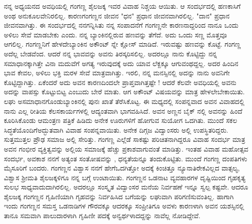 {ನನ್ನ ಅಧ್ಯಯನದ ಅವಧಿಯಲ್ಲಿ ಗಂಗಣ್ಣ ಶೈಲಜಕ್ಕ ಇವರ ವಿವಾಹ ನಿಶ್ಚಯ ಆಯಿತು. ಆ ಸಂದರ್ಭದಲ್ಲಿ ಹಣಕಾಸಿಗೆ ಅಂಥ ಅನುಕೂಲವೇನಿರಲಿಲ್ಲ. ಕಾರಣ\break ಗಂಗಣ್ಣನ ಜೀವನ "ಧನ" ಪ್ರಧಾನ ಜೀವನವಾಗಿರಲಿಲ್ಲ. "ದಾನ" ಪ್ರಧಾನ  ಜೀವನವಾಗಿತ್ತು. ಈ ಸಂದರ್ಭದಲ್ಲಿ ನನಗನ್ನಿಸಿತು \enginline{-} ನನ್ನ ಸಂಪಾದನೆಗೆ ಗಂಗಣ್ಣನೇ ಕಾರಣನಾದ್ದರಿಂದ ನಾನೂ ಒಂದು ಅಳಿಲು ಸೇವೆ ಮಾಡಬೇಕು ಎಂದು. ನನ್ನ ಬ್ಯಾಂಕಿನಲ್ಲಿರುವ ಹಣವನ್ನು ತೆಗೆದೆ. ಅದು ಒಂದು ಸಣ್ಣ ಮೊತ್ತವೂ ಆಗಲಿಲ್ಲ. ಗಂಗಣ್ಣನಿಗೆ ಹೇಳದೇ\break ಬ್ಯಾಂಕಿನ ಅಕೌಂಟ್ ನ್ನೇ ಕ್ಲೋಸ್ ಮಾಡಿದೆ. ಇರುವಷ್ಟು ಹಣವನ್ನು ಕೊಟ್ಟೆ.  ಗಂಗಣ್ಣ ಅದೆಲ್ಲ  ಬೇಡವೆಂದ. ಆದರೆ ನನ್ನ ಭಾವವನ್ನು ಅವನು ತಿರಸ್ಕರಿಸಲಿಲ್ಲ. ಅದರಲ್ಲೂ ನಾನು ಕೊಟ್ಟಿದ್ದು ನನ್ನ ಸಮಾಧಾನಕ್ಕಾಗಿತ್ತೇ ವಿನಾ ಮದುವೆಗೆ ಅಗತ್ಯ ಇರುವುದಕ್ಕೆ ಅದು ಯಾವ ಲೆಕ್ಖಕ್ಕೂ ಆಗುವಂಥದ್ದಲ್ಲ. ಅದರ ಹಿಂದಿನ ಭಾವ ಕೇವಲ, ಅಳಿಲು ಭಕ್ತಿ ಮರಳ ಸೇವೆ  ಮಾತ್ರವಾಗಿತ್ತು. ಇರಲಿ, ನನ್ನ ಮನಸ್ಸಿನಲ್ಲಿ ಅದನ್ನು ನಾನು ಅವನಿಗೇ ಕೊಟ್ಟಿದ್ದಾಗಿತ್ತು. ಏಕೆಂದರೆ ಅದು ಅವನ ಕಾರಣದಿಂದಲೇ ಪ್ರಾಪ್ತವಾಗಿತ್ತಷ್ಟೇ ! ಆದರೆ ಕೆಲವೇ ಅವಧಿಯಲ್ಲಿ ಅವನು ಅದನ್ನು ವಾಪಸ್ಸು ಕೊಟ್ಟುಬಿಟ್ಟ ಎಂಬುದು ಬೇರೆ ಮಾತು. ಆಗ ಅಕೌಂಟ್ ವಿಷಯವನ್ನು ಮಾತ್ರ ಹೇಳಲೇಬೇಕಾಯಿತು. ಲಘು ಅಸಮಾಧಾನಗೊಂಡು\break ಬ್ಯಾಂಕಿನಲ್ಲಿ  ಪುನಃ ಖಾತೆ ತೆರೆಸಿಕೊಟ್ಟ. ಈ ಮಧ್ಯದಲ್ಲಿ ಸಂಪನ್ನವಾದ ಅವನ \hbox{ವಿವಾಹದಲ್ಲಿ} ನಾನು ಎಲ್ಲ ರೀತಿಯ ಕೆಲಸ\enginline{-}ಕಾರ್ಯಗಳಲ್ಲಿ ಆದ್ಯಂತವಾಗಿ ಭಾಗವಹಿಸಿದೆ. ಅವನ ಅಣ್ಣನ ಬೈಕ್ ನಲ್ಲಿ ಅವನನ್ನು ಹಿಂದೆ ಕೂರಿಸಿಕೊಂಡು ಆಮಂತ್ರಣ ಪತ್ರಿಕೆ ಹಿಡಿದು ಅನೇಕ ಊರುಗಳಿಗೆ ಹೋಗುವ ಸುಯೋಗ ಒದಗಿತು.  ಮುಂದೆ ಸಕಲ ಸಿದ್ಧತೆಯೊಂದಿಗೆ\break ಅದ್ಭುತವಾಗಿ ವಿವಾಹ ಸಂಪನ್ನವಾಯಿತು. ಅನೇಕ ದಿಗ್ಗಜ ವಿದ್ವಾಂಸರು ಅಲ್ಲಿ ಉಪಸ್ಥಿತರಿದ್ದರು. ಸುತ್ತಮುತ್ತಲ ಪ್ರೌಢ ಸಮಾಜ ಅಲ್ಲಿ ಸೇರಿತ್ತು. ಗಂಗಣ್ಣ ಎಲ್ಲೆಡೆ ಸಾಕಷ್ಟು  ಪರಿಚಿತನಾಗಿದ್ದರೂ ವಿವಾಹ ಸಂದರ್ಭ ಮಾತ್ರ ಅವನ ಗಂಭೀರ ವ್ಯಕ್ತಿತ್ವವನ್ನು ಅಲ್ಲಿಯ ಸಮಾಜಕ್ಕೆ  ಹೆಚ್ಚು ಪ್ರಕಾಶವಾಗುವಂತೆ ಮಾಡಿತ್ತು. ಇಂತಹ ವಿವಾಹ ಮಹೋತ್ಸವ ಸಂದರ್ಭ,  ಅವಕಾಶ ನನಗೆ ಅತ್ಯಂತ ಸಂತೋಷವನ್ನು , ಧನ್ಯತೆಯನ್ನೂ ತಂದುಕೊಟ್ಟಿತು. ಮುಂದೆ ಗಂಗಣ್ಣ ದಂಪತಿಗಳು ಮೈಸೂರಿಗೆ ಬಂದರು. ಗಂಗಣ್ಣನ ವಿಶ್ವಾಸ ನನಗೆ ಹೇಗೆ\break ಒದಗಿತ್ತೋ ಅದಕ್ಕೆ ಕಿಂಚಿತ್ತೂ ನ್ಯೂನಾತಿರೇಕವಿಲ್ಲದ ವಾತ್ಸಲ್ಯ, ವಿಶ್ವಾಸ ಶ್ರೀಮತಿ \hbox{ಶೈಲಜಕ್ಕಳಿಗೂ} ನನ್ನ ಬಗ್ಗೆ ಉಂಟಾಯಿತು.  ಗಂಗಣ್ಣನ ಒಡನಾಟ ವ್ಯವಹಾರಗಳ ದೃಷ್ಟಿಯಿಂದ  ಗೃಹಕೃತ್ಯ ಸುಲಭ ಸಾಧ್ಯವಾದುದಾಗಿರಲಿಲ್ಲ. ಅದರಲ್ಲೂ ಸಂಸ್ಕೃತ ವಿದ್ವಾಂಸರ ಮನೆಯ ನಿರ್ವಹಣೆ ಇನ್ನೂ ಸ್ವಲ್ಪ ಕಷ್ಟವೇ. ಆದರೂ ಶೈಲಜಕ್ಕ ಗಂಗಣ್ಣನ ಗೃಹಿಣಿಯಾಗಿ ಗೃಹವನ್ನು ನಿರ್ವಹಿಸಿದ ಬಗೆಯನ್ನು ಲಘುವಾಗಿ  ಪರಿಗಣಿಸುವಂತಿಲ್ಲ. ಹಾಗಾಗಿ ಇಂದು  ಗಂಗಣ್ಣನ ಸಮಸ್ತ ಒಡನಾಡಿಗಳ ಗೌರವಕ್ಕೂ ಆದರಕ್ಕೂ ಸಂಪ್ರೀತಿಗೂ ಅವಳು \hbox{ಕಾರಣಳಾಗಿ} ಅವನ ಯಶಸ್ಸಿನಲ್ಲಿ ತಾನೂ ಸಮವಾಗಿ ಪಾಲುದಾರಳಾಗಿ ಗೃಹಿಣೀ ಪದಕ್ಕೆ ಅನ್ವರ್ಥಳಾದದ್ದನ್ನು ನಾವೆಲ್ಲ ನೋಡಿದ್ದೇವೆ.

}
